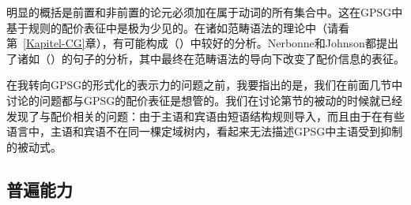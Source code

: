 \zl
明显的概括是前置和非前置的论元必须加在属于动词的所有集合中。这在GPSG中基于规则的配价表征中是极为少见的。在诸如范畴语法的理论中（请看第~\ref{Kapitel-CG}章），有可能构成（）中较好的分析\citep{Geach70a}。Nerbonne和Johnson都提出了诸如（）的句子的分析，其中最终在范畴语法的导向下改变了配价信息的表征。

在我转向GPSG的形式化的表示力的问题之前，我要指出的是，我们在前面几节中讨论的问题都与GPSG的配价表征是想管的。我们在讨论第节的被动的时候就已经发现了与配价相关的问题：由于主语和宾语由短语结构规则导入，而且由于在有些语言中，主语和宾语不在同一棵定域树内，看起来无法描述GPSG中主语受到抑制的被动式。

\subsection{普遍能力}

